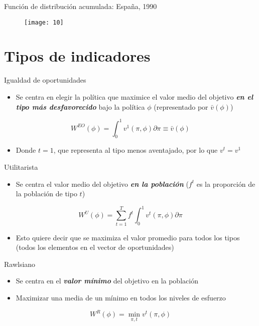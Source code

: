 \documentclass[11.5 pt]{beamer}
\begin{document}
\begin{frame}{Función de distribución acumulada: España, 1990}
	\begin{figure}
		\texttt{[image: 10]}
	\end{figure}
\end{frame}




\section{Tipos de indicadores}
\begin{frame}{Igualdad de oportunidades}
	\begin{itemize}
		\item Se centra en elegir la política que maximice el valor medio del objetivo \textbf{\textit{en el tipo más desfavorecido}} bajo la política $\phi$ (representado por $\bar{v} (\phi)$)
	\end{itemize}
	\begin{equation}
		W^{EO} (\phi) = \int_{0}^{1} v^{1} (\pi , \phi) \partial \pi \equiv \bar{v} (\phi)
	\end{equation}
	\begin{itemize}
		\item Donde $t = 1$, que representa al tipo menos aventajado, por lo que $v^{t} = v^{1}$
	\end{itemize}
\end{frame}

\begin{frame}{Utilitarista}
	\begin{itemize}
		\item Se centra el valor medio del objetivo \textbf{\textit{en la población}} ($f^{t}$ es la proporción de la población de tipo $t$)
	\end{itemize}
	\begin{equation}
		W^{U} (\phi) = \sum_{t=1}^{T} f^{t} \int_{0}^{1} v^{t} (\pi , \phi) \partial \pi
	\end{equation}
	\begin{itemize}
		\item Esto quiere decir que se maximiza el valor promedio para todos los tipos (todos los elementos en el vector de oportunidades)
	\end{itemize}
\end{frame}


\begin{frame}{Rawlsiano}
	\begin{itemize}
		\item Se centra en el \textbf{\textit{valor mínimo}} del objetivo en la población
		\item Maximizar una media de un mínimo en todos los niveles de esfuerzo
	\end{itemize}
	\begin{equation}
		W^{R} (\phi) = \min_{\pi , t} v^{t} (\pi , \phi)
	\end{equation}		
\end{frame}
\end{document}
